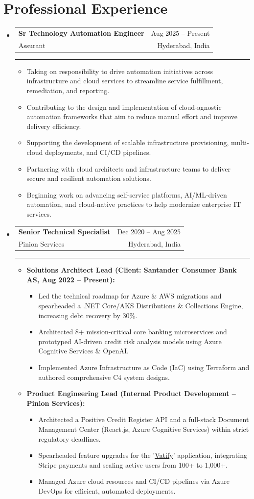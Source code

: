 \documentclass[12pt]{article}
\makeatletter
\newcommand{\CompanyOne}{Pinion Services}
\newcommand{\CompanyOneOne}{(Client: Santander Consumer Bank AS, Aug 2022 – Present)}
\newcommand{\CompanyOneTwo}{(Internal Product Development – Pinion Services)}
\newcommand{\ProductVatify}{Vatify}
\newcommand{\resumeItem}[1]{
  \item\small{
    {#1 \vspace{-2pt}}
  }
}
\newcommand{\resumeSubheading}[4]{
  \item %
    \begin{tabular*}{0.97\textwidth}[t]{l@{\extracolsep{\fill}}r}
       {\textbf{#1}} & \small{#2} \\ 
       {\small#3} & \small {#4} \\ 
    \end{tabular*} \vspace{2pt} %
    \noindent\rule{0.97\textwidth}{0.4pt} \vspace{-4pt} %
}
\newcommand{\resumeItemListStart}{\begin{itemize}[leftmargin=0.25in]} %
\newcommand{\resumeItemListEnd}{\end{itemize}\vspace{-5pt}}
\makeatother
\begin{document}
\section{Professional Experience}
\begin{itemize}[leftmargin=0in, label={}] %

    \resumeSubheading
      {Sr Technology Automation Engineer}{Aug 2025 – Present}
      {Assurant}{Hyderabad, India}
      \resumeItemListStart
        \resumeItem{Taking on responsibility to drive automation initiatives across infrastructure and cloud services to streamline service fulfillment, remediation, and reporting.}
        \resumeItem{Contributing to the design and implementation of cloud-agnostic automation frameworks that aim to reduce manual effort and improve delivery efficiency.}
        \resumeItem{Supporting the development of scalable infrastructure provisioning, multi-cloud deployments, and CI/CD pipelines.}
        \resumeItem{Partnering with cloud architects and infrastructure teams to deliver secure and resilient automation solutions.}
        \resumeItem{Beginning work on advancing self-service platforms, AI/ML-driven automation, and cloud-native practices to help modernize enterprise IT services.}
      \resumeItemListEnd
      
    \resumeSubheading
      {Senior Technical Specialist}{Dec 2020 – Aug 2025}
      {{\CompanyOne}}{Hyderabad, India}
      \resumeItemListStart %
        \resumeItem{\textbf{Solutions Architect Lead {\CompanyOneOne}:}}
            \begin{itemize} %
                \resumeItem{Led the technical roadmap for Azure \& AWS migrations and spearheaded a .NET Core/AKS Distributions \& Collections Engine, increasing debt recovery by 30\%.}
                \resumeItem{Architected 8+ mission-critical core banking microservices and prototyped AI-driven credit risk analysis models using Azure Cognitive Services \& OpenAI.}
                \resumeItem{Implemented Azure Infrastructure as Code (IaC) using Terraform and authored comprehensive C4 system designs.}
            \end{itemize}
            \vspace{2pt}
        \resumeItem{\textbf{Product Engineering Lead {\CompanyOneTwo}:}}
            \begin{itemize} %
                \resumeItem{Architected a Positive Credit Register API and a full-stack Document Management Center (React.js, Azure Cognitive Services) within strict regulatory deadlines.}
                \resumeItem{Spearheaded feature upgrades for the '\href{https://vatify.pinion.services}{{\underline{{\ProductVatify}}}}' application, integrating Stripe payments and scaling active users from 100+ to 1,000+.}
                \resumeItem{Managed Azure cloud resources and CI/CD pipelines via Azure DevOps for efficient, automated deployments.}
            \end{itemize}
      \resumeItemListEnd %


\end{itemize}
\end{document}
